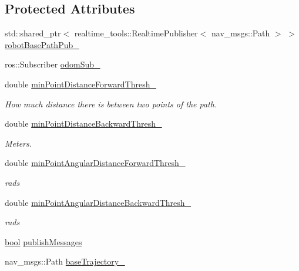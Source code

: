 \subsection*{Protected Attributes}
\begin{DoxyCompactItemize}
\item 
std\+::shared\+\_\+ptr$<$ realtime\+\_\+tools\+::\+Realtime\+Publisher$<$ nav\+\_\+msgs\+::\+Path $>$ $>$ \hyperlink{classsmacc__odom__tracker_1_1OdomTracker_a32d060919f2630e0695ce016c0563a3f}{robot\+Base\+Path\+Pub\+\_\+}
\item 
ros\+::\+Subscriber \hyperlink{classsmacc__odom__tracker_1_1OdomTracker_a901bd60f4c1d21537a160d034ff504ef}{odom\+Sub\+\_\+}
\item 
double \hyperlink{classsmacc__odom__tracker_1_1OdomTracker_a0017d7740d99c2cc8ba946495b96ce41}{min\+Point\+Distance\+Forward\+Thresh\+\_\+}
\begin{DoxyCompactList}\small\item\em How much distance there is between two points of the path. \end{DoxyCompactList}\item 
double \hyperlink{classsmacc__odom__tracker_1_1OdomTracker_a79d94520c5da1852602aaf264377a82f}{min\+Point\+Distance\+Backward\+Thresh\+\_\+}
\begin{DoxyCompactList}\small\item\em Meters. \end{DoxyCompactList}\item 
double \hyperlink{classsmacc__odom__tracker_1_1OdomTracker_a1611f6e11f48e8c2bdf6d16adf35fa2a}{min\+Point\+Angular\+Distance\+Forward\+Thresh\+\_\+}
\begin{DoxyCompactList}\small\item\em rads \end{DoxyCompactList}\item 
double \hyperlink{classsmacc__odom__tracker_1_1OdomTracker_ac7cac171a63c8981f8233f71c94d0776}{min\+Point\+Angular\+Distance\+Backward\+Thresh\+\_\+}
\begin{DoxyCompactList}\small\item\em rads \end{DoxyCompactList}\item 
\hyperlink{classbool}{bool} \hyperlink{classsmacc__odom__tracker_1_1OdomTracker_a5aaa7b76cae6ed70524d0f2ac04cbe70}{publish\+Messages}
\item 
nav\+\_\+msgs\+::\+Path \hyperlink{classsmacc__odom__tracker_1_1OdomTracker_ac3a17be46ab833632c5f63e75c840dc7}{base\+Trajectory\+\_\+}

\end{DoxyCompactItemize}
